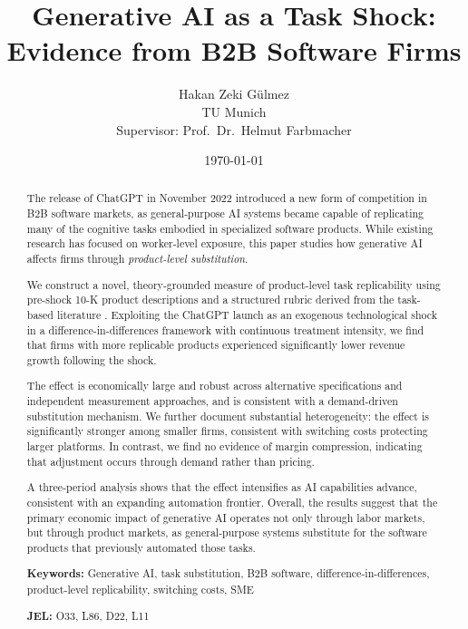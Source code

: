 \documentclass[12pt,a4paper]{article}
\title{
    \textbf{Generative AI as a Task Shock: \\
    Evidence from B2B Software Firms}
    \vspace{0.5em}
}
\author{
    Hakan Zeki G\"ulmez \\
    \small TU Munich \\
    \small Supervisor: Prof.\ Dr.\ Helmut Farbmacher
}
\date{\today}
\begin{document}
\maketitle
\thispagestyle{empty}

\begin{abstract}
\noindent
The release of ChatGPT in November 2022 introduced a new form of competition in B2B software markets, as general-purpose AI systems became capable of replicating many of the cognitive tasks embodied in specialized software products. While existing research has focused on worker-level exposure, this paper studies how generative AI affects firms through \emph{product-level substitution}.

We construct a novel, theory-grounded measure of product-level task replicability using pre-shock 10-K product descriptions and a structured rubric derived from the task-based literature \citep{eloundou2024, acemoglu2022, brynjolfsson2023}. Exploiting the ChatGPT launch as an exogenous technological shock in a difference-in-differences framework with continuous treatment intensity, we find that firms with more replicable products experienced significantly lower revenue growth following the shock.

The effect is economically large and robust across alternative specifications and independent measurement approaches, and is consistent with a demand-driven substitution mechanism. We further document substantial heterogeneity: the effect is significantly stronger among smaller firms, consistent with switching costs protecting larger platforms. In contrast, we find no evidence of margin compression, indicating that adjustment occurs through demand rather than pricing.

A three-period analysis shows that the effect intensifies as AI capabilities advance, consistent with an expanding automation frontier. Overall, the results suggest that the primary economic impact of generative AI operates not only through labor markets, but through product markets, as general-purpose systems substitute for the software products that previously automated those tasks.

\bigskip
\noindent\textbf{Keywords:} Generative AI, task substitution, B2B software, difference-in-differences, product-level replicability, switching costs, SME

\noindent\textbf{JEL:} O33, L86, D22, L11
\end{abstract}
\end{document}
